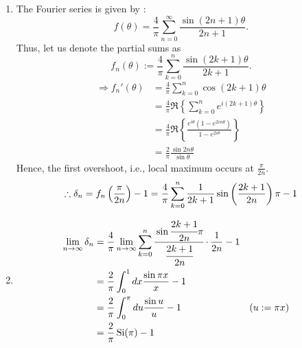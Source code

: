 \item

\begin{enumerate}[wide, labelindent = 0pt, label = (\alph*)]
\item
The Fourier series is given by :
\[
    f(\theta)
    = \frac{4}{\pi} \sum_{n=0}^\infty \frac{\sin (2n+1) \theta}{2n + 1}.
\]
Thus, let us denote the partial sums as
\[
    f_n (\theta)
    := \frac{4}{\pi} \sum_{k=0}^n \frac{\sin (2k+1) \theta}{2k + 1}.
\]
\begin{align*}
    \Rightarrow f_n'(\theta)
    &= \frac{4}{\pi} \sum_{k=0}^n \cos (2k+1) \theta \\
    &= \frac{4}{\pi} \Re \left\{ \sum_{k=0}^n e^{i (2k+1) \theta} \right\} \\
    &= \frac{4}{\pi} \Re \left\{ \frac{e^{i\theta} \left( 1 - e^{2in\theta} \right)}{1 - e^{2i\theta}} \right\} \\
    &= \frac{2}{\pi} \frac{\sin 2n\theta}{\sin \theta}
\end{align*}
Hence, the first overshoot, i.e., local maximum occurs at $\frac{\pi}{2n}$.
\[
    \therefore \delta_n
    = f_n \left( \frac{\pi}{2n} \right) - 1
    = \frac{4}{\pi} \sum_{k=0}^n \frac{1}{2k+1} \sin \left( \frac{2k+1}{2n} \right) \pi - 1
\]

\item
\begin{align*}
    \lim_{n \rightarrow \infty} \delta_n
    &= \frac{4}{\pi} \lim_{n \rightarrow \infty} \sum_{k=0}^n \cfrac{
        \sin \cfrac{2k+1}{2n} \pi
    }{\cfrac{2k+1}{2n}} \cdot \frac{1}{2n} - 1 \\
    &= \frac{2}{\pi} \int_0^1 dx \frac{\sin \pi x}{x} - 1 \\
    &= \frac{2}{\pi} \int_0^\pi du \frac{\sin u}{u} - 1 && (u := \pi x) \\
    &= \frac{2}{\pi} \operatorname{Si}(\pi) - 1
\end{align*}

\end{enumerate}

